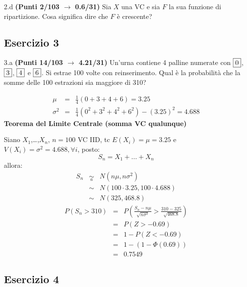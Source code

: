 \documentclass[
  11pt,
]{book}
\theoremstyle{mytheoremstyle}
\theoremstyle{mydefstyle}
\newenvironment{sol}
  {
  \begin{tcolorbox}[enhanced,breakable,arc=0.1mm,boxrule=1pt,colback=white,colframe=iblue,
  title=\bf \fontfamily{lmss}\selectfont \hspace{.5 cm} Soluzione,drop fuzzy shadow]

}{
\end{tcolorbox}
  }
\begin{document}
2.d \textbf{(Punti 2/103 \(\rightarrow\) 0.6/31)} Sia \(X\) una VC e sia \(F\) la sua funzione di ripartizione. Cosa significa dire che \(F\) è crescente?

\subsection{Esercizio 3}\label{esercizio-3-20}

3.a \textbf{(Punti 14/103 \(\rightarrow\) 4.21/31)} Un'urna contiene 4 palline numerate con \(\fbox{0}\), \(\fbox{3}\), \(\fbox{4}\) e \(\fbox{6}\). Si estrae 100 volte con reinserimento. Qual è la probabilità che la somme delle 100 estrazioni sia maggiore di 310?

\begin{sol}
\begin{eqnarray*}
 \mu &=& \frac 1{ 4 }(  0 + 3 + 4 + 6  )= 3.25 \\ 
 \sigma^2 &=& \frac 1{ 4 }(  0 ^2+ 3 ^2+ 4 ^2+ 6 ^2 )-( 3.25 )^2= 4.688 
\end{eqnarray*}
\textbf{Teorema del Limite Centrale (somma VC qualunque)}

Siano \(X_1\),\ldots,\(X_n\), \(n=100\) VC IID, tc \(E(X_i)=\mu=3.25\) e \(V(X_i)=\sigma^2=4.688,\forall i\), posto:
\[
      S_n = X_1 + ... + X_n
      \]
allora:\begin{eqnarray*}
  S_n & \mathop{\sim}\limits_{a}& N(n\mu,n\sigma^2) \\
     &\sim & N(100\cdot3.25,100\cdot4.688) \\
     &\sim & N(325,468.8) 
  \end{eqnarray*}\begin{eqnarray*}
      P( S_n   >   310 ) 
        &=& P\left(  \frac { S_n  -  n\mu }{ \sqrt{n\sigma^2} }  >  \frac { 310  -  325 }{\sqrt{ 468.8 }} \right)  \\
                 &=& P\left(  Z   >   -0.69 \right) \\    &=& 1-P(Z< -0.69 )\\ 
                 &=&  1-(1-\Phi( 0.69 )) \\ &=&  0.7549 
      \end{eqnarray*}

\end{sol}

\subsection{Esercizio 4}\label{esercizio-4-20}
\end{document}
